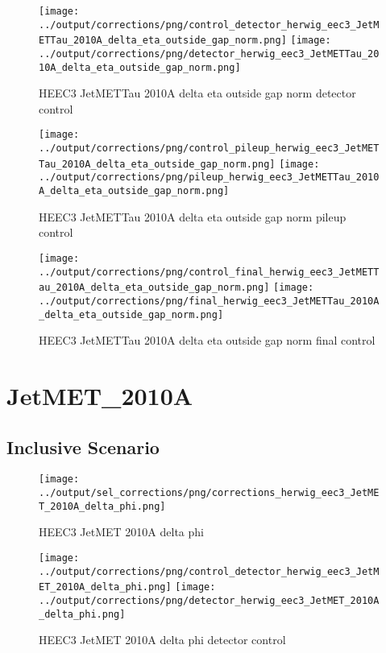 \documentclass[11pt]{book}
\begin{document}
\begin{figure}[ht]
\centering
\texttt{[image: ../output/corrections/png/control\_detector\_herwig\_eec3\_JetMETTau\_2010A\_delta\_eta\_outside\_gap\_norm.png]}
\texttt{[image: ../output/corrections/png/detector\_herwig\_eec3\_JetMETTau\_2010A\_delta\_eta\_outside\_gap\_norm.png]}
\caption{HEEC3 JetMETTau 2010A delta eta outside gap norm detector control}
\label{fig:HEEC3_JetMETTau_2010A_delta_eta_outside_gap_norm_detector_control}
\end{figure}

\begin{figure}[ht]
\centering
\texttt{[image: ../output/corrections/png/control\_pileup\_herwig\_eec3\_JetMETTau\_2010A\_delta\_eta\_outside\_gap\_norm.png]}
\texttt{[image: ../output/corrections/png/pileup\_herwig\_eec3\_JetMETTau\_2010A\_delta\_eta\_outside\_gap\_norm.png]}
\caption{HEEC3 JetMETTau 2010A delta eta outside gap norm pileup control}
\label{fig:HEEC3_JetMETTau_2010A_delta_eta_outside_gap_norm_pileup_control}
\end{figure}


\begin{figure}[ht]
\centering
\texttt{[image: ../output/corrections/png/control\_final\_herwig\_eec3\_JetMETTau\_2010A\_delta\_eta\_outside\_gap\_norm.png]}
\texttt{[image: ../output/corrections/png/final\_herwig\_eec3\_JetMETTau\_2010A\_delta\_eta\_outside\_gap\_norm.png]}
\caption{HEEC3 JetMETTau 2010A delta eta outside gap norm final control}
\label{fig:HEEC3_JetMETTau_2010A_delta_eta_outside_gap_norm_final_control}
\end{figure}
\cleardoublepage

\section{JetMET\_2010A}

\subsection{Inclusive Scenario}
\begin{figure}[ht]
\centering
\texttt{[image: ../output/sel\_corrections/png/corrections\_herwig\_eec3\_JetMET\_2010A\_delta\_phi.png]}
\caption{HEEC3 JetMET 2010A delta phi}
\label{fig:HEEC3_JetMET_2010A_delta_phi}
\end{figure}

\begin{figure}[ht]
\centering
\texttt{[image: ../output/corrections/png/control\_detector\_herwig\_eec3\_JetMET\_2010A\_delta\_phi.png]}
\texttt{[image: ../output/corrections/png/detector\_herwig\_eec3\_JetMET\_2010A\_delta\_phi.png]}
\caption{HEEC3 JetMET 2010A delta phi detector control}
\label{fig:HEEC3_JetMET_2010A_delta_phi_detector_control}
\end{figure}
\end{document}
